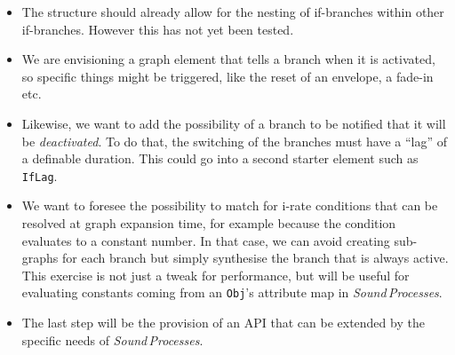 \documentclass[11pt,a4paper]{article}
\newcommand{\software}[1]{\textit{#1}}
\begin{document}
\begin{itemize}
\item The structure should already allow for the nesting of if-branches within other if-branches. However this has not yet been tested.
\item We are envisioning a graph element that tells a branch when it is activated, so specific things might be triggered, like the reset of an envelope, a fade-in etc.
\item Likewise, we want to add the possibility of a branch to be notified that it will be \emph{deactivated}. To do that, the switching of the branches must have a ``lag'' of a definable duration. This could go into a second starter element such as \Verb!IfLag!.
\item We want to foresee the possibility to match for i-rate conditions that can be resolved at graph expansion time, for example because the condition evaluates to a constant number. In that case, we can avoid creating sub-graphs for each branch but simply synthesise the branch that is always active. This exercise is not just a tweak for performance, but will be useful for evaluating constants coming from an \Verb!Obj!'s attribute map in \software{Sound\,Processes}.
\item The last step will be the provision of an API that can be extended by the specific needs of \software{Sound\,Processes}.
\end{itemize}

\end{document}
